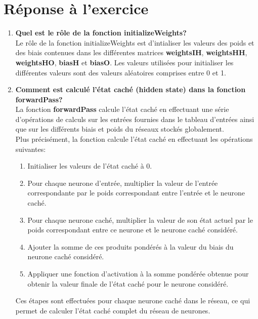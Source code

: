 \section{Réponse à l'exercice}
\begin{enumerate}
  \item {
    \textbf{Quel est le rôle de la fonction initializeWeights?} \vspace{0.2cm}\\
    Le rôle de la fonction initializeWeights est d'intialiser les valeurs des poids et des biais contenues 
    dans les différentes matrices \textbf{weightsIH}, \textbf{weightsHH}, \textbf{weightsHO}, \textbf{biasH} et \textbf{biasO}. 
    Les valeurs utilisées pour initialiser les différentes valeurs sont des valeurs aléatoires comprises entre 0 et 1.
  } \\
  \item {
    \textbf{Comment est calculé l'état caché (hidden state) dans la fonction forwardPass?} \vspace{0.2cm}\\
    La fonction \textbf{forwardPass} calcule l'état caché en effectuant une série d'opérations de calculs sur les entrées fournies
    dans le tableau d'entrées ainsi que sur les différents biais et poids du réseaux stockés globalement. \\
    Plus précisément, la fonction calcule l'état caché en effectuant les opérations suivantes:
    \begin{enumerate}
      \item Initialiser les valeurs de l'état caché à 0.
      \item Pour chaque neurone d'entrée, multiplier la valeur de l'entrée correspondante par le poids correspondant entre l'entrée et le neurone caché.
      \item Pour chaque neurone caché, multiplier la valeur de son état actuel par le poids correspondant entre ce neurone et le neurone caché considéré.
      \item Ajouter la somme de ces produits pondérés à la valeur du biais du neurone caché considéré.
      \item Appliquer une fonction d'activation à la somme pondérée obtenue pour obtenir la valeur finale de l'état caché pour le neurone considéré.
    \end{enumerate}
    Ces étapes sont effectuées pour chaque neurone caché dans le réseau, ce qui permet de calculer l'état caché complet du réseau de neurones.
  } \\

\end{enumerate}
